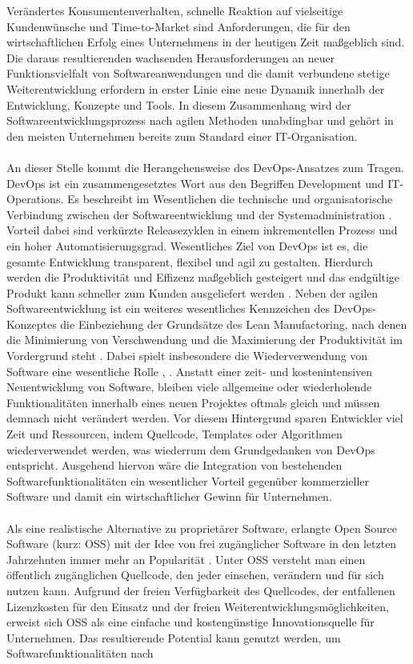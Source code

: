 Verändertes Konsumentenverhalten, schnelle Reaktion auf vielseitige Kundenwünsche und Time-to-Market sind Anforderungen, die für den wirtschaftlichen Erfolg eines Unternehmens in der heutigen Zeit maßgeblich sind. Die daraus resultierenden wachsenden Herausforderungen an neuer Funktionsvielfalt von Softwareanwendungen und die damit verbundene stetige Weiterentwicklung erfordern in erster Linie eine neue Dynamik innerhalb der Entwicklung, Konzepte und Tools. In diesem Zusammenhang wird der Softwareentwicklungsprozess nach agilen Methoden unabdingbar und gehört in den meisten Unternehmen bereits zum Standard einer IT-Organisation. \\\\ An dieser Stelle kommt die Herangehensweise des DevOps-Ansatzes zum Tragen. DevOps ist ein zusammengesetztes Wort aus den Begriffen Development und IT-Operations. Es beschreibt im Wesentlichen die technische und organisatorische Verbindung zwischen der Softwareentwicklung und der Systemadministration \cite[S. 23]{alt_innovationsorientiertes_2017}. Vorteil dabei sind verkürzte Releasezyklen in einem inkrementellen Prozess und ein hoher Automatisierungsgrad. Wesentliches Ziel von DevOps ist es, die gesamte Entwicklung transparent, flexibel und agil zu gestalten. Hierdurch werden die Produktivität und Effizenz maßgeblich gesteigert und das endgültige Produkt kann schneller zum Kunden ausgeliefert werden \cite{hemon_agile_2020}. Neben der agilen Softwareentwicklung ist ein weiteres wesentliches Kennzeichen des DevOps-Konzeptes die Einbeziehung der Grundsätze des Lean Manufactoring, nach denen die Minimierung von Verschwendung und die Maximierung der Produktivität im Vordergrund steht \cite{samulat_raus_2017}. Dabei spielt insbesondere die Wiederverwendung von Software eine wesentliche Rolle \cite[S. 140 - 141]{poppendieck_lean_2010}, \cite[S. 38]{ravichandran_devops_2016}. Anstatt einer zeit- und kostenintensiven Neuentwicklung von Software, bleiben viele allgemeine oder wiederholende Funktionalitäten innerhalb eines neuen Projektes oftmals gleich und müssen demnach nicht verändert werden. Vor diesem Hintergrund sparen Entwickler viel Zeit und Ressourcen, indem Quellcode, Templates oder Algorithmen wiederverwendet werden, was wiederrum dem Grundgedanken von DevOps entspricht. Ausgehend hiervon wäre die Integration von bestehenden Softwarefunktionalitäten ein wesentlicher Vorteil gegenüber kommerzieller Software und damit ein wirtschaftlicher Gewinn für Unternehmen. \\\\ Als eine realistische Alternative zu proprietärer Software, erlangte Open Source Software (kurz: OSS) mit der Idee von frei zugänglicher Software in den letzten Jahrzehnten immer mehr an Popularität \cite[S. 21,22]{allmann_open_2019}. Unter OSS versteht man einen öffentlich zugänglichen Quellcode, den jeder einsehen, verändern und für sich nutzen kann. Aufgrund der freien Verfügbarkeit des Quellcodes, der entfallenen Lizenzkosten für den Einsatz und der freien Weiterentwicklungsmöglichkeiten, erweist sich OSS als eine einfache und kostengünstige Innovationsquelle für Unternehmen. Das resultierende Potential kann genutzt werden, um Softwarefunktionalitäten nach 